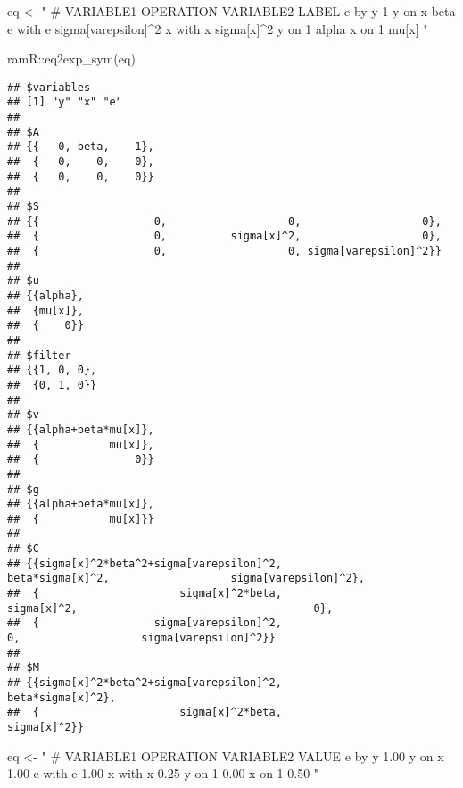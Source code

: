 \documentclass[
]{book}
\newenvironment{Shaded}{\begin{snugshade}}{\end{snugshade}}
\newcommand{\FunctionTok}[1]{\textcolor[rgb]{0.00,0.00,0.00}{#1}}
\newcommand{\NormalTok}[1]{#1}
\newcommand{\OtherTok}[1]{\textcolor[rgb]{0.56,0.35,0.01}{#1}}
\newcommand{\SpecialCharTok}[1]{\textcolor[rgb]{0.00,0.00,0.00}{#1}}
\newcommand{\StringTok}[1]{\textcolor[rgb]{0.31,0.60,0.02}{#1}}
\theoremstyle{definition}
\theoremstyle{definition}
\theoremstyle{definition}
\theoremstyle{remark}
\begin{document}
\begin{Shaded}
\begin{Highlighting}[]
\NormalTok{eq }\OtherTok{\textless{}{-}} \StringTok{"}
\StringTok{  \# VARIABLE1 OPERATION VARIABLE2 LABEL}
\StringTok{  e           by        y         1}
\StringTok{  y           on        x         beta}
\StringTok{  e           with      e         sigma[varepsilon]\^{}2}
\StringTok{  x           with      x         sigma[x]\^{}2}
\StringTok{  y           on        1         alpha}
\StringTok{  x           on        1         mu[x]}
\StringTok{"}
\end{Highlighting}
\end{Shaded}

\begin{Shaded}
\begin{Highlighting}[]
\NormalTok{ramR}\SpecialCharTok{::}\FunctionTok{eq2exp\_sym}\NormalTok{(eq)}
\end{Highlighting}
\end{Shaded}

\begin{verbatim}
## $variables
## [1] "y" "x" "e"
## 
## $A
## {{   0, beta,    1},
##  {   0,    0,    0},
##  {   0,    0,    0}} 
## 
## $S
## {{                  0,                   0,                   0},
##  {                  0,          sigma[x]^2,                   0},
##  {                  0,                   0, sigma[varepsilon]^2}} 
## 
## $u
## {{alpha},
##  {mu[x]},
##  {    0}} 
## 
## $filter
## {{1, 0, 0},
##  {0, 1, 0}} 
## 
## $v
## {{alpha+beta*mu[x]},
##  {           mu[x]},
##  {               0}} 
## 
## $g
## {{alpha+beta*mu[x]},
##  {           mu[x]}} 
## 
## $C
## {{sigma[x]^2*beta^2+sigma[varepsilon]^2,                       beta*sigma[x]^2,                   sigma[varepsilon]^2},
##  {                      sigma[x]^2*beta,                            sigma[x]^2,                                     0},
##  {                  sigma[varepsilon]^2,                                     0,                   sigma[varepsilon]^2}} 
## 
## $M
## {{sigma[x]^2*beta^2+sigma[varepsilon]^2,                       beta*sigma[x]^2},
##  {                      sigma[x]^2*beta,                            sigma[x]^2}}
\end{verbatim}

\begin{Shaded}
\begin{Highlighting}[]
\NormalTok{eq }\OtherTok{\textless{}{-}} \StringTok{"}
\StringTok{  \# VARIABLE1 OPERATION VARIABLE2 VALUE}
\StringTok{  e           by        y         1.00}
\StringTok{  y           on        x         1.00}
\StringTok{  e           with      e         1.00}
\StringTok{  x           with      x         0.25}
\StringTok{  y           on        1         0.00}
\StringTok{  x           on        1         0.50}
\StringTok{"}
\end{Highlighting}
\end{Shaded}
\end{document}
